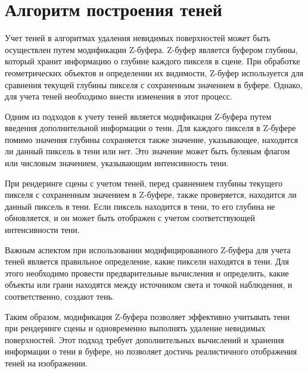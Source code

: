 \section{Алгоритм построения теней}

Учет теней в алгоритмах удаления невидимых поверхностей может быть осуществлен путем модификации Z-буфера. Z-буфер является буфером глубины, который хранит информацию о глубине каждого пикселя в сцене. При обработке геометрических объектов и определении их видимости, Z-буфер используется для сравнения текущей глубины пикселя с сохраненным значением в буфере. Однако, для учета теней необходимо внести изменения в этот процесс.

Одним из подходов к учету теней является модификация Z-буфера путем введения дополнительной информации о тени. Для каждого пикселя в Z-буфере помимо значения глубины сохраняется также значение, указывающее, находится ли данный пиксель в тени или нет. Это значение может быть булевым флагом или числовым значением, указывающим интенсивность тени.

При рендеринге сцены с учетом теней, перед сравнением глубины текущего пикселя с сохраненным значением в Z-буфере, также проверяется, находится ли данный пиксель в тени. Если пиксель находится в тени, то его глубина не обновляется, и он может быть отображен с учетом соответствующей интенсивности тени.

Важным аспектом при использовании модифицированного Z-буфера для учета теней является правильное определение, какие пиксели находятся в тени. Для этого необходимо провести предварительные вычисления и определить, какие объекты или грани находятся между источником света и точкой наблюдения, и соответственно, создают тень.

Таким образом, модификация Z-буфера позволяет эффективно учитывать тени при рендеринге сцены и одновременно выполнять удаление невидимых поверхностей. Этот подход требует дополнительных вычислений и хранения информации о тени в буфере, но позволяет достичь реалистичного отображения теней на изображении.